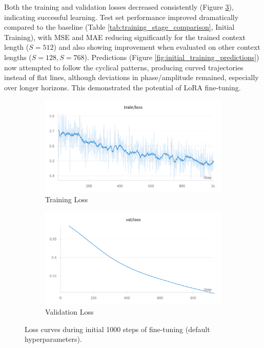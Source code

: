 \documentclass{article}
\begin{document}
Both the training and validation losses decreased consistently (Figure \ref{fig:initial_loss_curves}), indicating successful learning. Test set performance improved dramatically compared to the baseline (Table \ref{tab:training_stage_comparison}, Initial Training), with MSE and MAE reducing significantly for the trained context length ($S=512$) and also showing improvement when evaluated on other context lengths ($S=128, S=768$). Predictions (Figure \ref{fig:initial_training_predictions}) now attempted to follow the cyclical patterns, producing curved trajectories instead of flat lines, although deviations in phase/amplitude remained, especially over longer horizons. This demonstrated the potential of LoRA fine-tuning.

\begin{figure}[!htbp]
    \centering
    \begin{subfigure}[b]{0.48\linewidth} \centering
        \includegraphics[width=\linewidth]{M2 Course Work//Images/initial_train_loss.png}
        \caption{Training Loss} \label{fig:initial_train_loss}
    \end{subfigure} \hfill
    \begin{subfigure}[b]{0.48\linewidth} \centering
        \includegraphics[width=\linewidth]{M2 Course Work//Images/initial_validation_loss.png}
        \caption{Validation Loss} \label{fig:initial_valid_loss}
    \end{subfigure}
    \caption{Loss curves during initial 1000 steps of fine-tuning (default hyperparameters).} %
    \label{fig:initial_loss_curves}
\end{figure}
\end{document}

